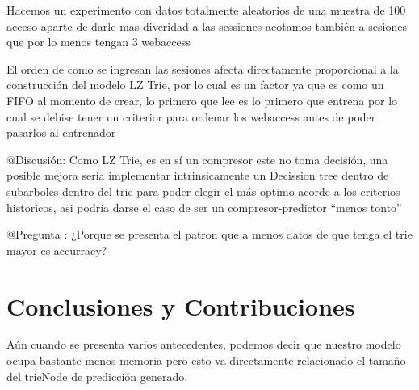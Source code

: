  
 


 

Hacemos un experimento con datos totalmente aleatorios de una muestra de 100 acceso
aparte de darle mas diveridad a las sessiones acotamos también a sesiones que por lo menos tengan
3 webaccess 

 

El orden de como se ingresan las sesiones afecta directamente proporcional a la construcción del modelo LZ Trie,
por lo cual es un factor ya que es como un FIFO al momento de crear, lo primero que lee es lo primero que entrena
por lo cual se debise tener un criterior para ordenar los webaccess antes de poder pasarlos al entrenador

@Discusión: Como LZ Trie, es en sí un compresor este no toma decisión, una posible mejora
sería implementar intrinsicamente un Decission tree dentro de subarboles dentro del trie para
poder elegir el más optimo acorde a los criterios historicos, asi podría darse el caso de ser
un compresor-predictor  ``menos tonto''


@Pregunta : ¿Porque se presenta el patron que a menos datos de que tenga el trie mayor es accurracy?

























\vspace{2cm}

\section{Conclusiones y Contribuciones}


Aún cuando se presenta varios antecedentes, podemos decir que nuestro modelo ocupa bastante menos memoria pero esto va directamente relacionado el tamaño del trieNode de predicción generado.

